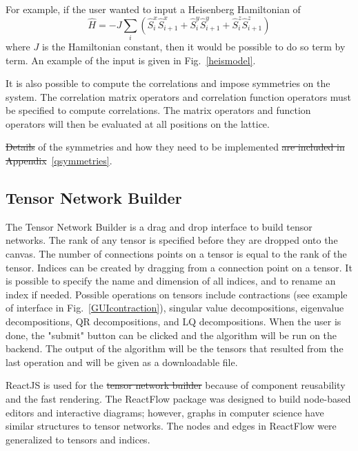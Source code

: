\documentclass{juliacon}
\providecommand{\DIFaddtex}[1]{{\protect\color{blue}\uwave{#1}}} %
\providecommand{\DIFdeltex}[1]{{\protect\color{red}\sout{#1}}}                      %
\providecommand{\DIFaddbegin}{} %
\providecommand{\DIFaddend}{} %
\providecommand{\DIFdelbegin}{} %
\providecommand{\DIFdelend}{} %
\providecommand{\DIFadd}[1]{\texorpdfstring{\DIFaddtex{#1}}{#1}} %
\providecommand{\DIFdel}[1]{\texorpdfstring{\DIFdeltex{#1}}{}} %
\begin{document}
For example, if the user wanted to input a Heisenberg Hamiltonian of 
\begin{equation}\label{heisMPO}
\hat H = -J\sum_{i} \left( \hat S^x_i \hat S^x_{i+1} + \hat S^y_i \hat S^y_{i+1} + \hat S^z_i \hat S^z_{i+1}\right)
\end{equation}
where $J$ is the Hamiltonian constant, then it would be possible to do so term by term. An example of the input is given in Fig.~\ref{heismodel}.

It is also possible to compute the correlations and impose symmetries on the system. The correlation matrix operators and correlation function operators must be specified to compute correlations. The matrix operators and function operators will then be evaluated at all positions on the lattice. 

\DIFdelbegin \DIFdel{Details }\DIFdelend \DIFaddbegin \DIFadd{For details }\DIFaddend of the symmetries and how they need to be implemented \DIFdelbegin \DIFdel{are included in Appendix}\DIFdelend \DIFaddbegin \DIFadd{see}\DIFaddend ~\ref{qsymmetries}.




\subsection{Tensor Network Builder}

The Tensor Network Builder is a drag and drop interface to build tensor networks. The rank of any tensor is specified before they are dropped onto the canvas. The number of connections points on a tensor is equal to the rank of the tensor. Indices can be created by dragging from a connection point on a tensor. It is possible to specify the name and dimension of all indices, and to rename an index if needed. Possible operations on tensors include contractions (see example of interface in Fig.~\ref{GUIcontraction}), singular value decompositions, eigenvalue decompositions, QR decompositions, and LQ decompositions. When the user is done, the "submit" button can be clicked and the algorithm will be run on the backend. The output of the algorithm will be the tensors that resulted from the last operation and will be given as a downloadable file.

ReactJS is used for the \DIFdelbegin \DIFdel{tensor network builder }\DIFdelend \DIFaddbegin \DIFadd{Tensor Network Builder }\DIFaddend because of component reusability and the fast rendering. The ReactFlow package was designed to build node-based editors and interactive diagrams; however, graphs in computer science have similar structures to tensor networks. The nodes and edges in ReactFlow were generalized to tensors and indices. 
\end{document}
